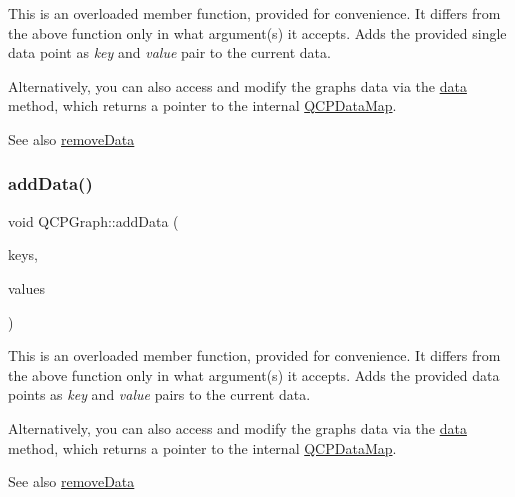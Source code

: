 This is an overloaded member function, provided for convenience. It differs from the above function only in what argument(s) it accepts. Adds the provided single data point as {\itshape key} and {\itshape value} pair to the current data.

Alternatively, you can also access and modify the graph\textquotesingle{}s data via the \mbox{\hyperlink{class_q_c_p_graph_acde1c0d1f6a817930489548396e6b3e6}{data}} method, which returns a pointer to the internal \mbox{\hyperlink{qcustomplot_8h_a84a9c4a4c2216ccfdcb5f3067cda76e3}{Q\+C\+P\+Data\+Map}}.

\begin{DoxySeeAlso}{See also}
\mbox{\hyperlink{class_q_c_p_graph_a4a0fde50b7db9db0a85b5c5b6b10098f}{remove\+Data}} 
\end{DoxySeeAlso}
\mbox{\label{class_q_c_p_graph_ab6da6377541fe80d892a9893a92db9c6}} 
\subsubsection{\texorpdfstring{add\+Data()}{addData()}\hspace{0.1cm}{\footnotesize\ttfamily [4/4]}}
{\footnotesize\ttfamily void Q\+C\+P\+Graph\+::add\+Data (\begin{DoxyParamCaption}\item[{const Q\+Vector$<$ double $>$ \&}]{keys,  }\item[{const Q\+Vector$<$ double $>$ \&}]{values }\end{DoxyParamCaption})}

This is an overloaded member function, provided for convenience. It differs from the above function only in what argument(s) it accepts. Adds the provided data points as {\itshape key} and {\itshape value} pairs to the current data.

Alternatively, you can also access and modify the graph\textquotesingle{}s data via the \mbox{\hyperlink{class_q_c_p_graph_acde1c0d1f6a817930489548396e6b3e6}{data}} method, which returns a pointer to the internal \mbox{\hyperlink{qcustomplot_8h_a84a9c4a4c2216ccfdcb5f3067cda76e3}{Q\+C\+P\+Data\+Map}}.

\begin{DoxySeeAlso}{See also}
\mbox{\hyperlink{class_q_c_p_graph_a4a0fde50b7db9db0a85b5c5b6b10098f}{remove\+Data}} 
\end{DoxySeeAlso}
\mbox{\label{class_q_c_p_graph_ad4e94a4e44e5e76fbec81a72a977157d}} 
